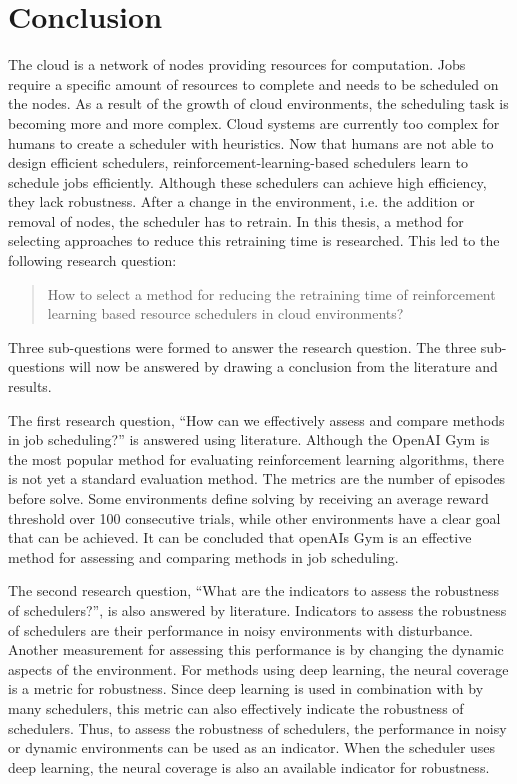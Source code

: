 \chapter{Conclusion}\label{sec:conclusion}

The cloud is a network of nodes providing resources for computation. Jobs
require a specific amount of resources to complete and needs to be scheduled
on the nodes. As a result of the growth of cloud environments, the scheduling
task is becoming more and more complex. Cloud systems are currently too
complex for humans to create a scheduler with heuristics. Now that humans are
not able to design efficient schedulers, reinforcement-learning-based
schedulers learn to schedule jobs efficiently. Although these \rlbased
schedulers can achieve high efficiency, they lack robustness. After a change
in the environment, i.e. the addition or removal of nodes, the scheduler has
to retrain. In this thesis, a method for selecting approaches to reduce this
retraining time is researched. This led to the following research question:
\begin{quote}
How to select a method for reducing the retraining time of reinforcement learning
    based resource schedulers in cloud environments?
\end{quote}
Three sub-questions were formed to answer the research question. The three
sub-questions will now be answered by drawing a conclusion from the literature
and results.

The first research question, ``How can we effectively assess and compare
\rlbased methods in job scheduling?'' is answered using literature. Although
the OpenAI Gym is the most popular method for evaluating reinforcement
learning algorithms, there is not yet a standard evaluation method. The
metrics are the number of episodes before solve. Some environments define
solving by receiving an average reward threshold over 100 consecutive trials,
while other environments have a clear goal that can be achieved. It can be
concluded that openAIs Gym is an effective method for assessing and comparing
\rlbased methods in job scheduling.

The second research question, ``What are the indicators to assess the
robustness of \rlbased schedulers?'', is also answered by literature.
Indicators to assess the robustness of \rlbased schedulers are their performance
in noisy environments with disturbance. Another measurement for
assessing this performance is by changing the dynamic aspects of the
environment. For methods using deep learning, the neural coverage is a metric
for robustness. Since deep learning is used in combination with \rl by many
schedulers, this metric can also effectively indicate the robustness of \rlbased
schedulers. Thus, to assess the robustness of \rlbased schedulers, the performance
in noisy or dynamic environments can be used as an indicator. When the scheduler
uses deep learning, the neural coverage is also an available indicator for
robustness.

